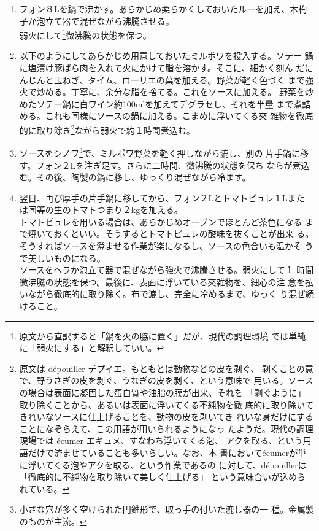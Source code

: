 \documentclass[twoside,12Q,b5paper]{escoffierltjsbook}
\begin{document}
\begin{enumerate}
\def\labelenumi{\arabic{enumi}.}
\item
  フォン８Lを鍋で沸かす。あらかじめ柔らかくしておいたルーを加え、木杓
  子か泡立て器で混ぜながら沸騰させる。\\
  弱火にして\footnote{原文から直訳すると「鍋を火の脇に置く」だが、現代の調理環境
    では単純に「弱火にする」と解釈していい。}微沸騰の状態を保つ。
\item
  以下のようにしてあらかじめ用意しておいたミルポワを投入する。ソテー
  鍋に塩漬け豚ばら肉を入れて火にかけて脂を溶かす。そこに、細かく刻ん
  だにんじんと玉ねぎ、タイム、ローリエの葉を加える。野菜が軽く色づく
  まで強火で炒める。丁寧に、余分な脂を捨てる。これをソースに加える。
  野菜を炒めたソテー鍋に白ワイン約100mlを加えてデグラセし、それを半量
  まで煮詰める。これも同様にソースの鍋に加える。こまめに浮いてくる夾
  雑物を徹底的に取り除き\footnote{原文は dépouiller
    デプイエ。もともとは動物などの皮を剥ぐ、
    剥くことの意で、野うさぎの皮を剥ぐ、うなぎの皮を剥く、という意味で
    用いる。ソースの場合は表面に凝固した蛋白質や油脂の膜が出来、それを
    「剥ぐように」取り除くことから、あるいは表面に浮いてくる不純物を徹
    底的に取り除いてきれいなソースに仕上げることを、動物の皮を剥いてき
    れいな身だけにすることになぞらえて、この用語が用いられるようになっ
    たようだ。現代の調理現場では écumer エキュメ、すなわち浮いてくる泡、
    アクを取る、という用語だけで済ませていることも多いらしい。なお、本
    書においてécumerが単に浮いてくる泡やアクを取る、という作業であるの
    に対して、dépouillerは「徹底的に不純物を取り除いて美しく仕上げる」
    という意味合いが込められている。}ながら弱火で約１時間煮込む。
\item
  ソースをシノワ\footnote{小さな穴が多く空けられた円錐形で、取っ手の付いた漉し器の一
    種。金属製のものが主流。}で、ミルポワ野菜を軽く押しながら漉し、別の
  片手鍋に移す。フォン２Lを注ぎ足す。さらに二時間、微沸騰の状態を保ち
  ならが煮込む。その後、陶製の鍋に移し、ゆっくり混ぜながら冷ます。
\item
  翌日、再び厚手の片手鍋に移してから、フォン２Lとトマトピュレ１Lまた
  は同等の生のトマトつまり２kgを加える。\\
  トマトピュレを用いる場合は、あらかじめオーブンでほとんど茶色になる
  まで焼いておくといい。そうするとトマトピュレの酸味を抜くことが出来
  る。\\
  そうすればソースを澄ませる作業が楽になるし、ソースの色合いも温かそ
  うで美しいものになる。\\
  ソースをヘラか泡立て器で混ぜながら強火で沸騰させる。弱火にして１
  時間微沸騰の状態を保つ。最後に、表面に浮いている夾雑物を、細心の注
  意を払いながら徹底的に取り除く。布で漉し、完全に冷めるまで、ゆっく
  り混ぜ続けること。
\end{enumerate}
\end{document}
